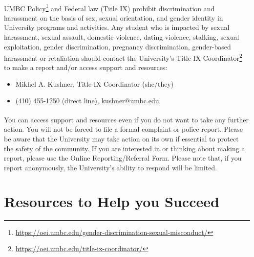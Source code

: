 \documentclass[letter,11pt]{article}
\begin{document}
\paragraph{}UMBC Policy\footnote{\url{https://oei.umbc.edu/gender-discrimination-sexual-misconduct/}} and Federal law (Title IX) prohibit discrimination and harassment on the basis of sex, sexual orientation, and gender identity in University programs and activities. Any student who is impacted by sexual harassment, sexual assault, domestic violence, dating violence, stalking, sexual exploitation, gender discrimination, pregnancy discrimination, gender-based harassment or retaliation should contact the University’s Title IX Coordinator\footnote{\url{https://oei.umbc.edu/title-ix-coordinator/}} to make a report and/or access support and resources:
\begin{itemize}
\item Mikhel A. Kushner, Title IX Coordinator (she/they)
\item \href{tel:+14104551250}{(410) 455-1250} (direct line), \href{mailto:kushner@umbc.edu?Subject=Title\%20IX}{kushner@umbc.edu}
\end{itemize}

\paragraph{}You can access support and resources even if you do not want to take any further action. You will not be forced to file a formal complaint or police report. Please be aware that the University may take action on its own if essential to protect the safety of the community. If you are interested in or thinking about making a report, please use the Online Reporting/Referral Form. Please note that, if you report anonymously,  the University’s ability to respond will be limited.

\section*{Resources to Help you Succeed}
\end{document}
